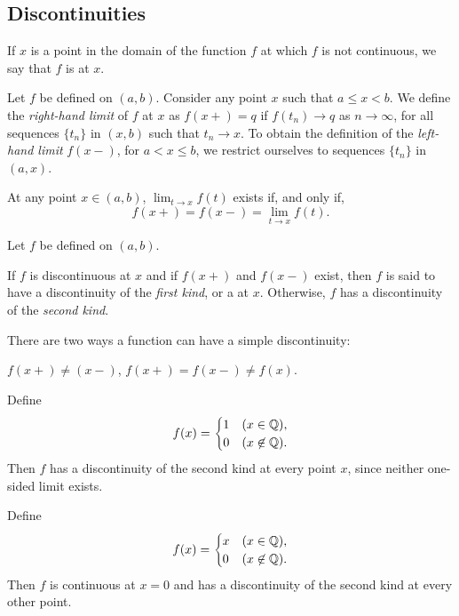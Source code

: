 \documentclass{article}
\begin{document}
\subsection{Discontinuities}
If $x$ is a point in the domain of the function $f$ at which $f$ is not continuous, we say that $f$ is  at $x$.
\begin{definition}
    Let $f$ be defined on $(a,b)$. Consider any point $x$ such that $a\leq x < b$. We define the \textit{right-hand limit} of $f$ at $x$ as $f(x+)=q$ if $f(t_{n})\rightarrow q$ as $n\rightarrow\infty$, for all sequences $\{t_{n}\}$ in $(x,b)$ such that $t_{n}\rightarrow x$. To obtain the definition of the \textit{left-hand limit} $f(x-)$, for $a<x\leq b$, we restrict ourselves to sequences $\{t_{n}\}$ in $(a,x)$.
\end{definition}
\begin{remark}
    At any point $x\in (a,b)$, $\lim_{t\rightarrow x}f(t)$ exists if, and only if,\[f(x+)=f(x-)=\lim_{t\rightarrow x}f(t).\]
\end{remark}
\begin{definition}
    Let $f$ be defined on $(a,b)$. 
    \begin{enumerate}
        \ii If $f$ is discontinuous at $x$ and if $f(x+)$ and $f(x-)$ exist, then $f$ is said to have a discontinuity of the \textit{first kind}, or a  at $x$.
        \ii Otherwise, $f$ has a discontinuity of the \textit{second kind}.
    \end{enumerate}
\end{definition}
\begin{remark}
    There are two ways a function can have a simple discontinuity:
    \begin{enumerate}
        \ii $f(x+)\neq(x-)$,
        \ii $f(x+)=f(x-)\neq f(x)$.
    \end{enumerate}
\end{remark}
\begin{example}
    Define 
    \[f(x)=\begin{cases}
        1 & (x\in \mathbb Q),\\
        0 & (x\not\in \mathbb Q).
    \end{cases}\]
    Then $f$ has a discontinuity of the second kind at every point $x$, since neither one-sided limit exists.
\end{example}
\begin{example}
    Define 
    \[f(x)=\begin{cases}
        x & (x\in \mathbb Q),\\
        0 & (x\not\in \mathbb Q).
    \end{cases}\]
    Then $f$ is continuous at $x=0$ and has a discontinuity of the second kind at every other point.
\end{example}
\end{document}
